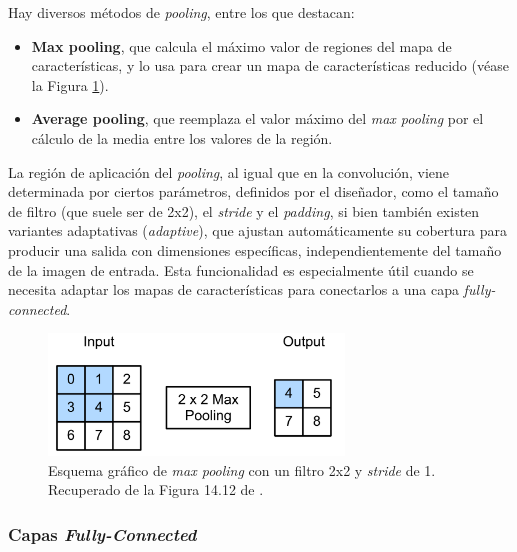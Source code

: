 Hay diversos métodos de \textit{pooling}, entre los que destacan:

\begin{itemize}

    \item \textbf{Max pooling}, que calcula el máximo valor de regiones del mapa de características, y lo
    usa para crear un mapa de características reducido (véase la Figura \ref{fig:max_pooling}).

    \item \textbf{Average pooling}, que reemplaza el valor máximo del \textit{max pooling} por el cálculo de
    la media entre los valores de la región. 

\end{itemize}

La región de aplicación del \textit{pooling}, al igual que en la convolución, viene determinada por ciertos 
parámetros, definidos por el diseñador, como el tamaño de filtro (que suele ser de 2x2), el \textit{stride} 
y el \textit{padding}, si bien también existen variantes  adaptativas (\textit{adaptive}), que ajustan
automáticamente su cobertura para producir una salida con dimensiones específicas, independientemente del 
tamaño de la imagen de entrada. Esta funcionalidad es especialmente útil cuando se necesita adaptar los mapas
de características para conectarlos a una capa \textit{fully-connected}. 

\begin{figure}[h]
    \centering
    \includegraphics[width=0.7\textwidth]{capitulos/cap_02/imagenes/max_pooling.png}
    \caption{
        Esquema gráfico de \textit{max pooling} con un filtro 2x2 y \textit{stride} de 1.
        Recuperado de la Figura 14.12 de \cite{murphy2022}.
    } 
    \label{fig:max_pooling}
\end{figure}



\subsubsection{Capas \textit{Fully-Connected}}

